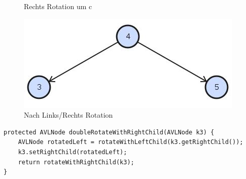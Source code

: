 \begin{figure}[h!]
\begin{minipage}[t]{0.4\textwidth}
		\caption{Rechts Rotation um c}
		\label{fig:searchtreeinsert2}
	\end{minipage}
	\begin{minipage}[t]{0.4\textwidth}
		\centering
		\includegraphics[width=0.9\linewidth]{images/avl_rotation_final}
		\caption{Nach Links/Rechts Rotation}
		\label{fig:searchtreeinsert2}
	\end{minipage}
\end{figure}
\begin{lstlisting}[caption=AVL Tree: Left/Right Rotation]
protected AVLNode doubleRotateWithRightChild(AVLNode k3) {
	AVLNode rotatedLeft = rotateWithLeftChild(k3.getRightChild());
	k3.setRightChild(rotatedLeft);
	return rotateWithRightChild(k3);
}
\end{lstlisting}

\clearpage

